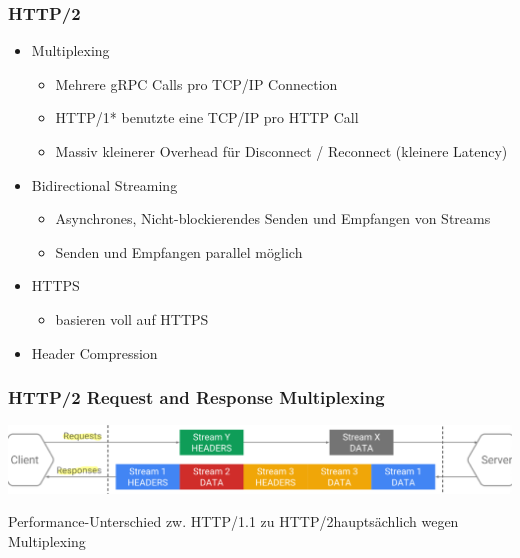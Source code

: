 \subsubsection{HTTP/2}
\begin{itemize}
    \item Multiplexing
    \begin{itemize}
        \item Mehrere gRPC Calls pro TCP/IP Connection
        \item HTTP/1* benutzte eine TCP/IP pro HTTP Call
        \item Massiv kleinerer Overhead für Disconnect / Reconnect (kleinere Latency)
    \end{itemize}
    \item Bidirectional Streaming
    \begin{itemize}
        \item Asynchrones, Nicht-blockierendes Senden und Empfangen von Streams
        \item Senden und Empfangen parallel möglich
    \end{itemize}
    \item HTTPS
    \begin{itemize}
        \item basieren voll auf HTTPS
    \end{itemize}
    \item Header Compression
\end{itemize}

\subsubsection{HTTP/2 Request and Response Multiplexing}
\begin{center}
    \includegraphics[scale=.3]{graphic/gprc/req resp.png}
\end{center}
\vspace{-8pt}
Performance-Unterschied zw. HTTP/1.1 zu HTTP/2hauptsächlich wegen Multiplexing

